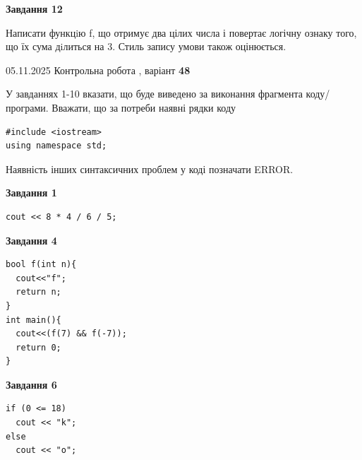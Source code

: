 \documentclass[12pt, ukrainian]{article}
\begin{document}
{\begin {large}
\begin{minipage}[t]{11.0cm}
\begin{center}
\textbf{Завдання 12}
\end{center}

Написати функцiю f, що отримує два цілих числа і повертає логічну ознаку того, що їх сума дiлиться на 3. Стиль запису умови також оцінюється.\par

\end{minipage}

\end {large}}
\newpage

{\Large{05.11.2025 Контрольна робота , варіант  \No \textbf { 48 }\par}}
{
\begin {large}
У завданнях 1-10 вказати, що буде виведено за виконання фрагмента коду/про\-гра\-ми.
Вважати, що за потреби наявні рядки коду
\begin{verbatim}
#include <iostream>
using namespace std;
\end{verbatim}
Наявність інших синтаксичних проблем у коді позначати ERROR.

\begin{minipage}[t]{7.0cm}

\begin{center}
\textbf{Завдання 1}
\end{center}
\vspace{-8mm}

\begin{verbatim}
cout << 8 * 4 / 6 / 5;
\end{verbatim}



\begin{center}
\textbf{Завдання 4}
\end{center}
\vspace{-8mm}

\begin{verbatim}
bool f(int n){
  cout<<"f";
  return n;
}
int main(){
  cout<<(f(7) && f(-7));
  return 0;
}
\end{verbatim}



\begin{center}
\textbf{Завдання 6}
\end{center}
\vspace{-8mm}

\begin{verbatim}
if (0 <= 18)
  cout << "k";
else
  cout << "o";
\end{verbatim}




\end{minipage}
\end{large}}
\end{document}
